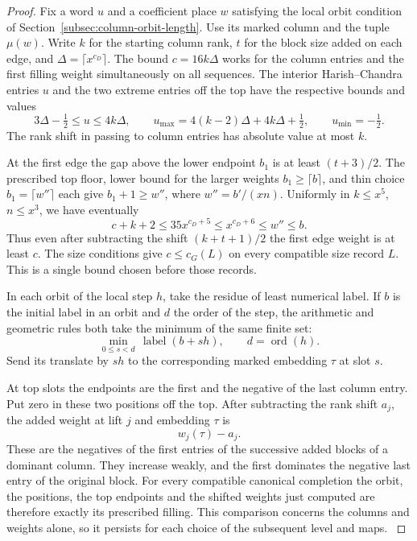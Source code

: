 \begin{proof}
Fix a word \(u\) and a coefficient place \(w\) satisfying the
local orbit condition of Section~\ref{subsec:column-orbit-length}.
Use its marked column and the tuple \(\mu(w)\). Write \(k\) for
the starting column rank, \(t\) for the block size added on each
edge, and \(\Delta=\lceil x^{c_D}\rceil\). The bound
\(c=16k\Delta\) works for the column entries and the first
filling weight simultaneously on all sequences. The interior Harish--Chandra entries \(u\) and the two extreme entries off the top have the respective bounds and values
\[
 3\Delta-\tfrac12\le u\le4k\Delta,\qquad u_{\max}=4(k-2)\Delta+4k\Delta+\tfrac12,\qquad u_{\min}=-\tfrac12 .
\]
The rank shift in passing to column entries has absolute value
at most \(k\).

At the first edge the gap above the lower
endpoint \(b_1\) is at least \((t+3)/2\). The prescribed
top floor, lower bound for the larger weights \(b_1\ge\lceil b\rceil\), and thin
choice \(b_1=\lceil w''\rceil\) each give \(b_1+1\ge w''\),
where \(w''=b'/(xn)\). Uniformly in \(k\le x^5\), \(n\le x^3\),
we have eventually
\[
 c+k+2\le35x^{c_D+5}\le x^{c_D+6}\le w''\le b.
\]
Thus even after subtracting the shift \((k+t+1)/2\) the first
edge weight is at least \(c\). The size conditions give
\(c\le c_G(L)\) on every compatible size record \(L\).
This is a single bound chosen before those records.

In each orbit of the local step \(h\), take the residue of
least numerical label. If \(b\) is the initial label in an orbit and \(d\) the order of the step, the arithmetic and geometric rules both take the minimum of the same finite set:
\[
 \min_{0\le s<d}\,\operatorname{label}(b+sh),\qquad d=\operatorname{ord}(h).
\] Send its translate by \(sh\) to the
corresponding marked embedding \(\tau\) at slot \(s\).

At top slots the endpoints are the first and the negative of
the last column entry. Put zero in these two positions off
the top. After subtracting the rank shift \(a_j\), the added weight at lift \(j\) and embedding \(\tau\) is
\[
 w_j(\tau)-a_j .
\] These are the
negatives of the first entries of the successive added blocks
of a dominant column. They increase weakly, and the first
dominates the negative last entry of the original block.
For every compatible canonical completion the orbit, the
positions, the top endpoints and the shifted weights just
computed are therefore exactly its prescribed filling. This
comparison concerns the columns and weights alone, so it
persists for each choice of the subsequent level and maps.
\label{cor:level-four-core-7}


\end{proof}

